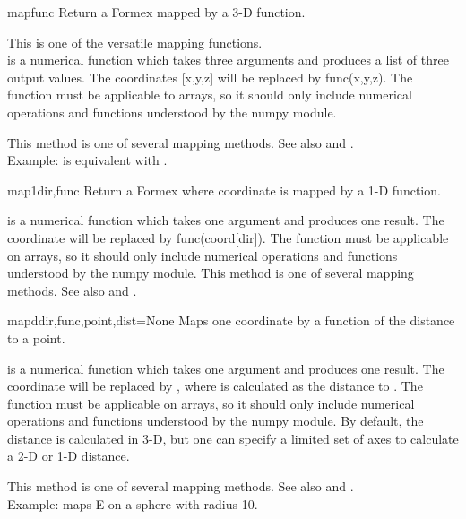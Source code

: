 {{\begin{methoddesc}{map}{func}
Return a Formex mapped by a 3-D function.

This is one of the versatile mapping functions.\\
 is a numerical function which takes three arguments and produces a list of three output values. The coordinates [x,y,z] will be replaced by func(x,y,z). The function must be applicable to arrays, so it should only include numerical operations and functions understood by the numpy module.

This method is one of several mapping methods. See also  and .\\
Example:  is equivalent with .
\end{methoddesc}

\begin{methoddesc}{map1}{dir,func}
Return a Formex where coordinate  is mapped by a 1-D function.

 is a numerical function which takes one argument and produces one result. The coordinate  will be replaced by func(coord[dir]). The function must be applicable on arrays, so it should only include numerical operations and functions understood by the numpy module. This method is one of several mapping methods. See also  and .
\end{methoddesc}

\begin{methoddesc}{mapd}{dir,func,point,dist=None}
Maps one coordinate by a function of the distance to a point.

 is a numerical function which takes one argument and produces one result. The coordinate  will be replaced by , where  is calculated as the distance to . The function must be applicable on arrays, so it should only include numerical operations and functions understood by the numpy module. By default, the distance  is calculated in 3-D, but one can specify a limited set of axes to calculate a 2-D or 1-D distance.

This method is one of several mapping methods. See also  and .\\
Example:  maps E on a sphere with radius 10.
\end{methoddesc}

}}
